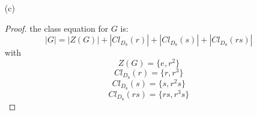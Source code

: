 \documentclass[12pt]{article}
\begin{document}
\begin{enumerate}
\begin{proof}
        Finally since the center and non-trivial conjugacy classes of $D_8$ partition it,
        this implies that the remaining conjugacy classes have size 2. However the remaining elements
        are not central, and this means their conjugacy classes have size at least 2. Thus there is
        only one conjugacy class remaining, and it is
        \[ Cl_{D_8}(rs) = \{rs, r^3s \} \]
    \end{proof}
    \item[(c)]
    \begin{proof}
        the class equation for $G$ is:
        \[ |G| = |Z(G)| + |Cl_{D_8}(r)| + |Cl_{D_8}(s)| + |Cl_{D_8}(rs)| \]
        with
        \[ Z(G) = \{ e, r^2 \} \]
        \[ Cl_{D_8}(r) = \{ r, r^3 \} \]
        \[ Cl_{D_8}(s) = \{ s, r^2s \} \]
        \[ Cl_{D_8}(rs) = \{ rs, r^3s \} \]
    \end{proof}
\end{enumerate}
\end{document}
